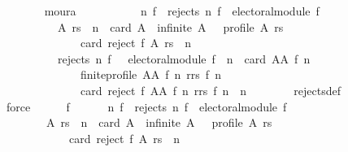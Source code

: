\begin{isabellebody}
\ \ \ \ \ \ \isamarkupfalse%
\ moura\isanewline
\ \ \ \ \isamarkupfalse%
\isanewline
\ \ \ \ \ \ {\isachardoublequoteopen}{\isasymforall}n\ f{\isachardot}{\kern0pt}\ {\isacharparenleft}{\kern0pt}{\isasymnot}\ rejects\ n\ f\ {\isasymor}\ electoral{\isacharunderscore}{\kern0pt}module\ f\ {\isasymand}\isanewline
\ \ \ \ \ \ \ \ \ \ {\isacharparenleft}{\kern0pt}{\isasymforall}A\ rs{\isachardot}{\kern0pt}\ {\isacharparenleft}{\kern0pt}{\isasymnot}\ n\ {\isasymle}\ card\ A\ {\isasymor}\ infinite\ A\ {\isasymor}\ {\isasymnot}\ profile\ A\ rs{\isacharparenright}{\kern0pt}\ {\isasymor}\isanewline
\ \ \ \ \ \ \ \ \ \ \ \ \ \ card\ {\isacharparenleft}{\kern0pt}reject\ f\ A\ rs{\isacharparenright}{\kern0pt}\ {\isacharequal}{\kern0pt}\ n{\isacharparenright}{\kern0pt}{\isacharparenright}{\kern0pt}\ {\isasymand}\isanewline
\ \ \ \ \ \ \ \ \ \ {\isacharparenleft}{\kern0pt}rejects\ n\ f\ {\isasymor}\ {\isasymnot}\ electoral{\isacharunderscore}{\kern0pt}module\ f\ {\isasymor}\ {\isacharparenleft}{\kern0pt}n\ {\isasymle}\ card\ {\isacharparenleft}{\kern0pt}AA\ f\ n{\isacharparenright}{\kern0pt}\ {\isasymand}\isanewline
\ \ \ \ \ \ \ \ \ \ \ \ \ \ finite{\isacharunderscore}{\kern0pt}profile\ {\isacharparenleft}{\kern0pt}AA\ f\ n{\isacharparenright}{\kern0pt}\ {\isacharparenleft}{\kern0pt}rrs\ f\ n{\isacharparenright}{\kern0pt}{\isacharparenright}{\kern0pt}\ {\isasymand}\isanewline
\ \ \ \ \ \ \ \ \ \ \ \ \ \ card\ {\isacharparenleft}{\kern0pt}reject\ f\ {\isacharparenleft}{\kern0pt}AA\ f\ n{\isacharparenright}{\kern0pt}\ {\isacharparenleft}{\kern0pt}rrs\ f\ n{\isacharparenright}{\kern0pt}{\isacharparenright}{\kern0pt}\ {\isasymnoteq}\ n{\isacharparenright}{\kern0pt}{\isachardoublequoteclose}\isanewline
\ \ \ \ \ \ \isamarkupfalse%
\ rejects{\isacharunderscore}{\kern0pt}def\isanewline
\ \ \ \ \ \ \isamarkupfalse%
\ force\isanewline
\ \ \ \ \isamarkupfalse%
\ f{}{\isacharcolon}{\kern0pt}\isanewline
\ \ \ \ \ \ {\isachardoublequoteopen}{\isasymforall}n\ f{\isachardot}{\kern0pt}\ {\isacharparenleft}{\kern0pt}{\isasymnot}\ rejects\ n\ f\ {\isasymor}\ electoral{\isacharunderscore}{\kern0pt}module\ f\ {\isasymand}\isanewline
\ \ \ \ \ \ \ \ {\isacharparenleft}{\kern0pt}{\isasymforall}A\ rs{\isachardot}{\kern0pt}\ {\isasymnot}\ n\ {\isasymle}\ card\ A\ {\isasymor}\ infinite\ A\ {\isasymor}\ {\isasymnot}\ profile\ A\ rs\ {\isasymor}\isanewline
\ \ \ \ \ \ \ \ \ \ \ \ card\ {\isacharparenleft}{\kern0pt}reject\ f\ A\ rs{\isacharparenright}{\kern0pt}\ {\isacharequal}{\kern0pt}\ n{\isacharparenright}{\kern0pt}{\isacharparenright}{\kern0pt}\ {\isasymand}\isanewline

\end{isabellebody}
